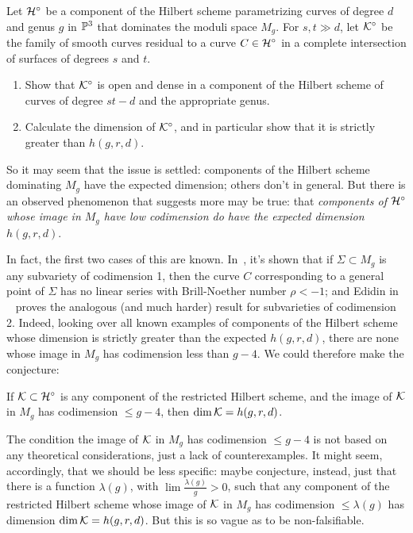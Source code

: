 \begin{exercise}
Let $\cH^\circ$ be a component of the Hilbert scheme parametrizing curves of degree $d$ and genus $g$ in $\PP^3$ that dominates the moduli space $M_g$. For $s, t \gg d$, let $\cK^\circ$ be the family of smooth curves residual to a curve $C \in  \cH^\circ$ in a complete intersection of surfaces of degrees $s$ and $t$.
\begin{enumerate}
\item Show that $\cK^\circ$ is open and dense in a component of the Hilbert scheme of curves of degree $st-d$ and the appropriate genus.
\item Calculate the dimension of $\cK^\circ$, and in particular show that it is strictly greater than $h(g,r,d)$.
\end{enumerate}
\end{exercise}

So it may seem that the issue is settled: components of the Hilbert scheme dominating $M_g$ have the expected dimension; others don't in general. But there is an observed phenomenon that suggests more may be true: that \emph{components of $\cH^\circ$ whose image in $M_g$ have low codimension do have the expected dimension $h(g,r,d)$}. 

In fact, the first two cases of this are known. In~\cite{Eisenbud-Harris}, it's shown that if $\Sigma \subset M_g$ is any subvariety of codimension 1, then the curve $C$ corresponding to a general point of $\Sigma$ has no linear series with Brill-Noether number $\rho < -1$; and Edidin in ~\cite{Edidin} proves the analogous (and much harder) result for subvarieties of codimension 2. Indeed, looking over all known examples of components of the Hilbert scheme whose dimension is strictly greater than the expected $h(g,r,d)$, there are none whose image in $M_g$ has codimension less than $g-4$. We could therefore make the conjecture:

\begin{conjecture}
If $\cK \subset \cH^\circ$ is any component of the restricted Hilbert scheme, and the image of $\cK$ in $M_g$ has codimension $\leq g-4$, then $\dim \cK = h(g,r,d)$.
\end{conjecture}

The condition the image of $\cK$ in $M_g$ has codimension $\leq g-4$ is not based on any theoretical considerations, just a lack of counterexamples. It might seem, accordingly, that we should be less specific: maybe conjecture, instead, just that there is a function $\lambda(g)$, with $\lim \frac{\lambda(g)}{g} > 0$, such that any component of the restricted Hilbert scheme whose image of $\cK$ in $M_g$ has codimension $\leq \lambda(g)$ has dimension $\dim \cK = h(g,r,d)$. But this is so vague as to be non-falsifiable.


